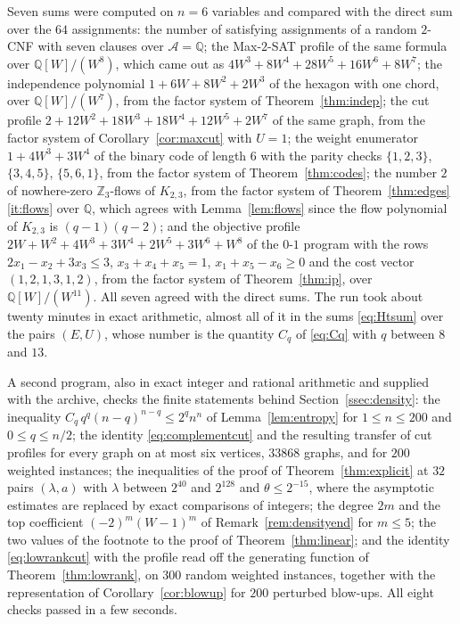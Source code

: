 \documentclass[11pt,reqno]{amsart}
\numberwithin{equation}{section}
\theoremstyle{plain}
\theoremstyle{definition}
\theoremstyle{remark}
\newcommand{\A}{\mathcal{A}}
\newcommand{\Q}{\mathbb{Q}}
\newcommand{\Z}{\mathbb{Z}}
\begin{document}
Seven sums were computed on $n=6$ variables and compared with the direct sum over
the $64$ assignments: the number of satisfying assignments of a random $2$-CNF
with seven clauses over $\A=\Q$; the Max-$2$-SAT profile of the same formula over
$\Q[W]/(W^{8})$, which came out as
$4W^{3}+8W^{4}+28W^{5}+16W^{6}+8W^{7}$; the independence polynomial
$1+6W+8W^{2}+2W^{3}$ of the hexagon with one chord, over $\Q[W]/(W^{7})$, from
the factor system of Theorem~\ref{thm:indep}; the cut profile
$2+12W^{2}+18W^{3}+18W^{4}+12W^{5}+2W^{7}$ of the same graph, from the factor
system of Corollary~\ref{cor:maxcut} with $U=1$; the weight enumerator
$1+4W^{3}+3W^{4}$ of the binary code of length $6$ with the parity checks
$\{1,2,3\}$, $\{3,4,5\}$, $\{5,6,1\}$, from the factor system of
Theorem~\ref{thm:codes}; the number $2$ of nowhere-zero $\Z_3$-flows of
$K_{2,3}$, from the factor system of Theorem~\ref{thm:edges}\ref{it:flows} over
$\Q$, which agrees with Lemma~\ref{lem:flows} since the flow polynomial of
$K_{2,3}$ is $(q-1)(q-2)$; and the objective profile
$2W+W^{2}+4W^{3}+3W^{4}+2W^{5}+3W^{6}+W^{8}$ of the $0$-$1$ program with the
rows $2x_1-x_2+3x_3\le3$, $x_3+x_4+x_5=1$, $x_1+x_5-x_6\ge0$ and the cost
vector $(1,2,1,3,1,2)$, from the factor system of Theorem~\ref{thm:ip}, over
$\Q[W]/(W^{11})$. All seven agreed with the direct sums. The run took
about twenty minutes in exact arithmetic, almost all of it in the sums
\eqref{eq:Htsum} over the pairs $(E,U)$, whose number is the quantity $C_q$ of
\eqref{eq:Cq} with $q$ between $8$ and $13$.

A second program, also in exact integer and rational arithmetic and supplied
with the archive, checks the finite statements behind Section~\ref{ssec:density}:
the inequality $C_q\,q^q(n-q)^{n-q}\le2^qn^n$ of Lemma~\ref{lem:entropy} for
$1\le n\le200$ and $0\le q\le n/2$; the identity \eqref{eq:complementcut} and the
resulting transfer of cut profiles for every graph on at most six vertices, $33868$
graphs, and for $200$ weighted instances; the inequalities of the proof of
Theorem~\ref{thm:explicit} at $32$ pairs $(\lambda,a)$ with $\lambda$ between $2^{40}$
and $2^{128}$ and $\theta\le2^{-15}$, where the asymptotic estimates are replaced
by exact comparisons of integers; the degree $2m$ and the top coefficient
$(-2)^m(W-1)^m$ of Remark~\ref{rem:densityend} for $m\le5$; the two values of
the footnote to the proof of Theorem~\ref{thm:linear}; and the identity
\eqref{eq:lowrankcut} with the profile read off the generating function of
Theorem~\ref{thm:lowrank}, on $300$ random weighted instances, together with the
representation of Corollary~\ref{cor:blowup} for $200$ perturbed blow-ups. All eight
checks passed in a few seconds.
\end{document}
